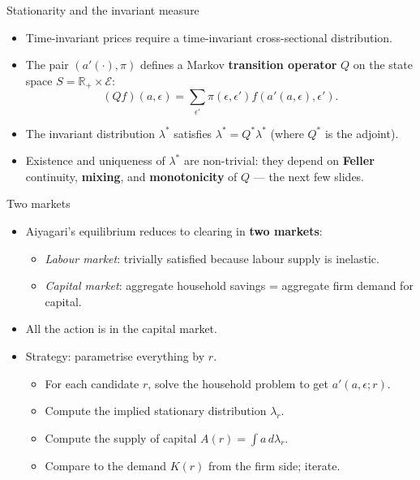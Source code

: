 \begin{frame}{Stationarity and the invariant measure}
\begin{itemize}
\item Time-invariant prices require a time-invariant cross-sectional distribution.
\medskip
\item The pair $(a'(\cdot), \pi)$ defines a Markov \textbf{transition operator} $Q$ on the state space $S = \mathbb{R}_+ \times \mathcal{E}$:
\[
(Qf)(a,\epsilon) = \sum_{\epsilon'} \pi(\epsilon,\epsilon') f(a'(a,\epsilon),\epsilon').
\]
\medskip
\item The invariant distribution $\lambda^*$ satisfies $\lambda^* = Q^* \lambda^*$ (where $Q^*$ is the adjoint).
\medskip
\item Existence and uniqueness of $\lambda^*$ are non-trivial: they depend on \textbf{Feller} continuity, \textbf{mixing}, and \textbf{monotonicity} of $Q$ --- the next few slides.
\end{itemize}
\end{frame}

\begin{frame}{Two markets}
\begin{itemize}
\item Aiyagari's equilibrium reduces to clearing in \textbf{two markets}:
  \begin{itemize}
  \item \emph{Labour market}: trivially satisfied because labour supply is inelastic.
  \item \emph{Capital market}: aggregate household savings = aggregate firm demand for capital.
  \end{itemize}
\medskip
\item All the action is in the capital market.
\medskip
\item Strategy: parametrise everything by $r$.
  \begin{itemize}
  \item For each candidate $r$, solve the household problem to get $a'(a,\epsilon;r)$.
  \item Compute the implied stationary distribution $\lambda_r$.
  \item Compute the supply of capital $A(r) = \int a\,d\lambda_r$.
  \item Compare to the demand $K(r)$ from the firm side; iterate.
  \end{itemize}
\end{itemize}
\end{frame}


